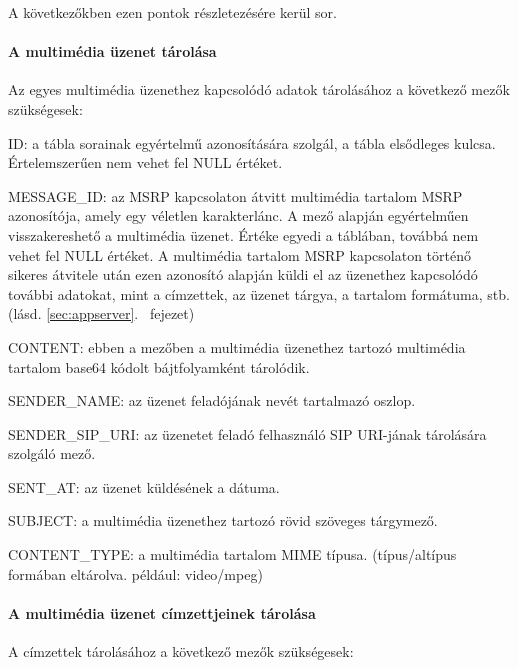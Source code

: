 A következőkben ezen pontok részletezésére kerül sor.

\paragraph*{A multimédia üzenet tárolása\\}

Az  egyes multimédia üzenethez kapcsolódó adatok tárolásához a következő mezők szükségesek:

\begin{mydescription}
\item[ID:] a tábla sorainak egyértelmű azonosítására szolgál, a tábla elsődleges kulcsa. Értelemszerűen nem vehet fel NULL értéket.
\item[MESSAGE\_ID:] az MSRP kapcsolaton átvitt multimédia tartalom MSRP azonosítója, amely egy véletlen karakterlánc. A mező alapján egyértelműen visszakereshető a multimédia üzenet. Értéke egyedi a táblában, továbbá nem vehet fel NULL értéket. A multimédia tartalom MSRP kapcsolaton történő sikeres átvitele után ezen azonosító alapján küldi el az üzenethez kapcsolódó további adatokat, mint a címzettek, az üzenet tárgya, a tartalom formátuma, stb. (lásd. \ref{sec:appserver}.~ fejezet) 
\item[CONTENT:] ebben a mezőben a multimédia üzenethez tartozó multimédia tartalom base64 kódolt bájtfolyamként tárolódik.
\item[SENDER\_NAME:] az üzenet feladójának nevét tartalmazó oszlop.
\item[SENDER\_SIP\_URI:] az üzenetet feladó felhasználó SIP URI-jának tárolására szolgáló mező.
\item[SENT\_AT:] az üzenet küldésének a dátuma. 
\item[SUBJECT:] a multimédia üzenethez tartozó rövid szöveges tárgymező.
\item[CONTENT\_TYPE:] a multimédia tartalom MIME típusa. (típus/altípus formában eltárolva. például: video/mpeg)
\end{mydescription}
\medskip

\paragraph*{A multimédia üzenet címzettjeinek tárolása\\}

A címzettek tárolásához a következő mezők szükségesek:

